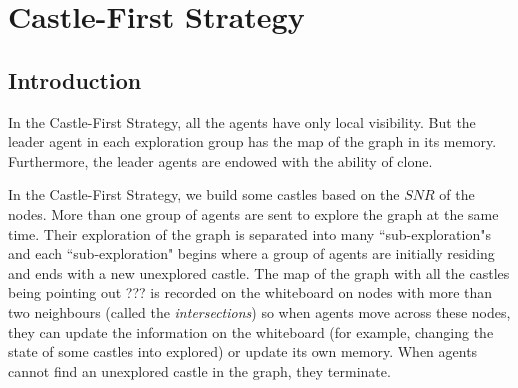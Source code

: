 

               
\section{Castle-First Strategy}
\subsection{ Introduction}
In the Castle-First Strategy, all the agents have only   local visibility. But the leader agent in each exploration group has the map of the graph in its memory. Furthermore, the leader agents are endowed with the ability of clone.

In the Castle-First Strategy, we build some castles based on the  $SNR$ of the nodes. More than one group of agents are sent to explore the graph at the same time. Their exploration of the graph is separated into many ``sub-exploration"s and each ``sub-exploration" begins   where a group of  agents are  initially residing  and ends with a new unexplored castle. The map of the graph with all the castles \color{blue} being pointing out  ??? \color{black} is recorded on the whiteboard on nodes with more than two neighbours (called the {\em intersections}) so when agents move across these nodes, they can update the information on the whiteboard (for example, changing the state of some castles into explored) or update its own memory. When agents cannot find an unexplored castle in the graph,   they terminate. 

